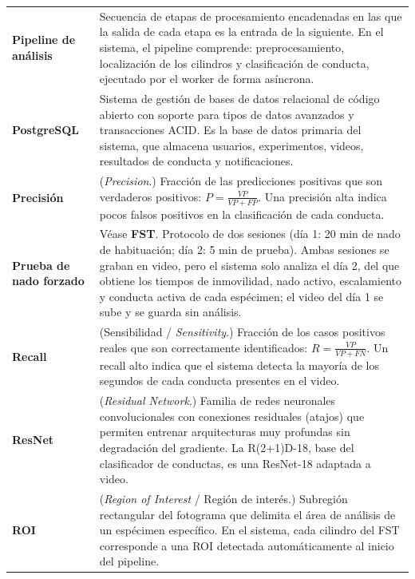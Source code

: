 \begin{longtable}{@{} p{4.0cm} p{10.9cm} @{}}
  \textbf{Pipeline de análisis}
  & Secuencia de etapas de procesamiento encadenadas en las que la salida de
    cada etapa es la entrada de la siguiente. En el sistema, el pipeline comprende:
    preprocesamiento, localización de los cilindros y clasificación de conducta,
    ejecutado por el worker de forma asíncrona. \\[5pt]

  \textbf{PostgreSQL}
  & Sistema de gestión de bases de datos relacional de código abierto con soporte
    para tipos de datos avanzados y transacciones ACID. Es la base de datos
    primaria del sistema, que almacena usuarios, experimentos, videos,
    resultados de conducta y notificaciones. \\[5pt]

  \textbf{Precisión}
  & (\textit{Precision}.) Fracción de las predicciones positivas que son
    verdaderos positivos: $P = \frac{VP}{VP + FP}$. Una precisión alta indica
    pocos falsos positivos en la clasificación de cada conducta. \\[5pt]

  \textbf{Prueba de nado forzado}
  & Véase \textbf{FST}. Protocolo de dos sesiones (día 1: 20 min de nado de
    habituación; día 2: 5 min de prueba). Ambas sesiones se graban en video, pero el
    sistema solo analiza el día 2, del que obtiene los tiempos de inmovilidad, nado
    activo, escalamiento y conducta activa de cada espécimen; el video del día 1 se
    sube y se guarda sin análisis. \\[5pt]

  \textbf{Recall}
  & (Sensibilidad / \textit{Sensitivity}.) Fracción de los casos positivos reales
    que son correctamente identificados: $R = \frac{VP}{VP + FN}$. Un recall alto
    indica que el sistema detecta la mayoría de los segundos de cada conducta
    presentes en el video. \\[5pt]

  \textbf{ResNet}
  & (\textit{Residual Network}.) Familia de redes neuronales convolucionales con
    conexiones residuales (atajos) que permiten entrenar arquitecturas muy
    profundas sin degradación del gradiente. La R(2+1)D-18, base del
    clasificador de conductas, es una ResNet-18 adaptada a video. \\[5pt]

  \textbf{ROI}
  & (\textit{Region of Interest} / Región de interés.) Subregión rectangular del
    fotograma que delimita el área de análisis de un espécimen específico. En el
    sistema, cada cilindro del FST corresponde a una ROI detectada automáticamente
    al inicio del pipeline. \\[5pt]


\end{longtable}
